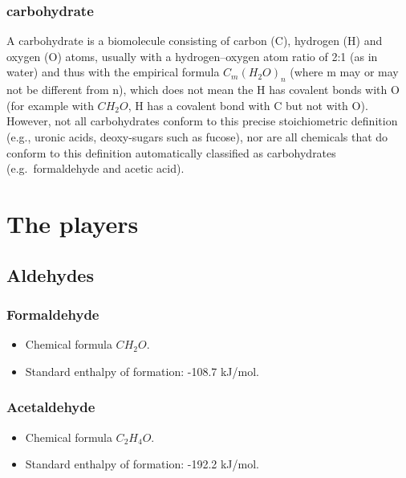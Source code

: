 \documentclass{article}
\begin{document}
\subsubsection{carbohydrate}
A carbohydrate is a biomolecule consisting of carbon (C), hydrogen (H) and oxygen (O)
atoms, usually with a hydrogen–oxygen atom ratio of 2:1 (as in water) and thus with the
empirical formula $C_m{(H_2O)}_n$ (where m may or may not be different from n), which does
not mean the H has covalent bonds with O (for example with $CH_2O$, H has a covalent bond
with C but not with O). However, not all carbohydrates conform to this precise
stoichiometric definition (e.g., uronic acids, deoxy-sugars such as fucose), nor are all
chemicals that do conform to this definition automatically classified as carbohydrates
(e.g.\ formaldehyde and acetic acid).


\pagebreak
\section{The players}\label{sec_players}

\subsection{Aldehydes}

\subsubsection{Formaldehyde}

\begin{itemize}
    \item Chemical formula $CH_2O$.
    \item Standard enthalpy of formation: -108.7 kJ/mol.
\end{itemize}

\subsubsection{Acetaldehyde}

\begin{itemize}
    \item Chemical formula $C_2H_4O$.
    \item Standard enthalpy of formation: -192.2 kJ/mol.
\end{itemize}
\end{document}
